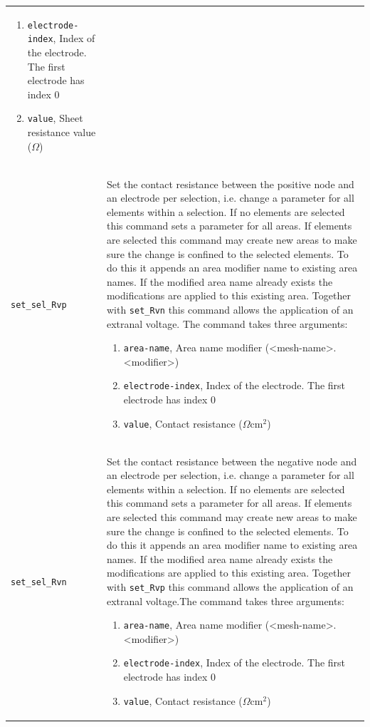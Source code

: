 \documentclass[noshowpacs,preprintnumbers,amsmath,amssymb, letter]{revtex4}
\begin{document}
\begin{longtable}{p{}p{}}
\begin{enumerate}
\item \texttt{electrode-index}, Index of the electrode. The first electrode has index 0
\item \texttt{value}, Sheet resistance value ($\Omega$)
\end{enumerate}\\
\texttt{set\_sel\_Rvp}	&  Set the contact resistance between the positive node and an electrode per selection, i.e. change a parameter for all elements within a selection. If no elements are selected this command sets a parameter for all areas. If elements are selected this command may create new areas to make sure the change is confined to the selected elements. To do this it appends an area modifier name to existing area names. If the modified area name already exists the modifications are applied to this existing area. Together with \texttt{set\_Rvn} this command allows the application of an extranal voltage. The command takes three arguments:
\begin{enumerate}
\item \texttt{area-name}, Area name modifier (\textless mesh-name\textgreater .\textless modifier\textgreater )
\item \texttt{electrode-index}, Index of the electrode. The first electrode has index 0
\item \texttt{value}, Contact resistance ($\Omega \text{cm}^2$)
\end{enumerate}\\
\texttt{set\_sel\_Rvn}	&  Set the contact resistance between the negative node and an electrode per selection, i.e. change a parameter for all elements within a selection. If no elements are selected this command sets a parameter for all areas. If elements are selected this command may create new areas to make sure the change is confined to the selected elements. To do this it appends an area modifier name to existing area names. If the modified area name already exists the modifications are applied to this existing area. Together with \texttt{set\_Rvp} this command allows the application of an extranal voltage.The command takes three arguments:
\begin{enumerate}
\item \texttt{area-name}, Area name modifier (\textless mesh-name\textgreater .\textless modifier\textgreater )
\item \texttt{electrode-index}, Index of the electrode. The first electrode has index 0
\item \texttt{value}, Contact resistance ($\Omega \text{cm}^2$)

\end{enumerate}
\end{longtable}
\end{document}
